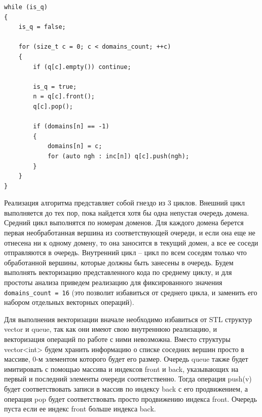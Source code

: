 \documentclass[
11pt,%
tightenlines,%
twoside,%
onecolumn,%
nofloats,%
nobibnotes,%
nofootinbib,%
superscriptaddress,%
noshowpacs,%
centertags]%
{revtex4}
\begin{document}
\begin{lstlisting}[caption={Реализация алгоритма пузырькового роста доменов.},label={lst:impl}]
while (is_q)
{
    is_q = false;

    for (size_t c = 0; c < domains_count; ++c)
    {
        if (q[c].empty()) continue;

        is_q = true;
        n = q[c].front();
        q[c].pop();

        if (domains[n] == -1)
        {
            domains[n] = c;
            for (auto ngh : inc[n]) q[c].push(ngh);
        }
    }
}
\end{lstlisting}

Реализация алгоритма представляет собой гнездо из 3 циклов.
Внешний цикл выполняется до тех пор, пока найдется хотя бы одна непустая очередь домена.
Средний цикл выполнятся по номерам доменов.
Для каждого домена берется первая необработанная вершина из соответствующей очереди, и если она еще не отнесена ни к одному домену, то она заносится в текущий домен, а все ее соседи отправляются в очередь.
Внутренний цикл -- цикл по всем соседям только что обработанной вершины, которые должны быть занесены в очередь.
Будем выполнять векторизацию представленного кода по среднему циклу, и для простоты анализа приведем реализацию для фиксированного значения \texttt{domains\_count = 16} (это позволит избавиться от среднего цикла, и заменить его набором отдельных векторных операций).

Для выполнения векторизации вначале необходимо избавиться от STL структур vector и queue, так как они имеют свою внутреннюю реализацию, и векторизация операций по работе с ними невозможна.
Вместо структуры vector<int> будем хранить информацию о списке соседних вершин просто в массиве, 0-м элементом которого будет его размер.
Очередь queue также будет имитировать с помощью массива и индексов front и back, указывающих на первый и последний элементы очереди соответственно.
Тогда операция push(v) будет соответствовать записи в массив по индексу back с его продвижением, а операция pop будет соответствовать просто продвижению индекса front.
Очередь пуста если ее индекс front больше индекса back.
\end{document}

